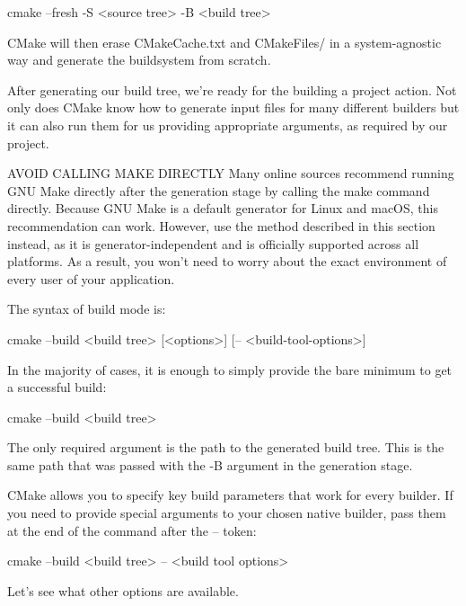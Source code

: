 \begin{shell}
cmake --fresh -S <source tree> -B <build tree>
\end{shell}

CMake will then erase CMakeCache.txt and CMakeFiles/ in a system-agnostic way and generate the buildsystem from scratch.


After generating our build tree, we’re ready for the building a project action. Not only does CMake know how to generate input files for many different builders but it can also run them for us providing appropriate arguments, as required by our project.

\begin{myNotic}{AVOID CALLING MAKE DIRECTLY}
Many online sources recommend running GNU Make directly after the generation stage by calling the make command directly. Because GNU Make is a default generator for Linux and macOS, this recommendation can work. However, use the method described in this section instead, as it is generator-independent and is officially supported across all platforms. As a result, you won’t need to worry about the exact environment of every user of your application.
\end{myNotic}

The syntax of build mode is:

\begin{shell}
cmake --build <build tree> [<options>] [-- <build-tool-options>]
\end{shell}

In the majority of cases, it is enough to simply provide the bare minimum to get a successful build:

\begin{shell}
cmake --build <build tree>
\end{shell}

The only required argument is the path to the generated build tree. This is the same path that was passed with the -B argument in the generation stage.

CMake allows you to specify key build parameters that work for every builder. If you need to provide special arguments to your chosen native builder, pass them at the end of the command after the -- token:

\begin{shell}
cmake --build <build tree> -- <build tool options>
\end{shell}

Let’s see what other options are available.

